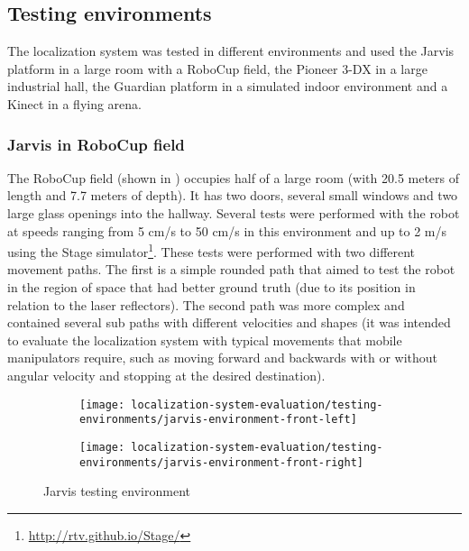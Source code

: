 \subsection{Testing environments}

The localization system was tested in different environments and used the Jarvis platform in a large room with a RoboCup field, the Pioneer 3-DX in a large industrial hall, the Guardian platform in a simulated indoor environment and a Kinect in a flying arena.


\subsubsection{Jarvis in RoboCup field}

The RoboCup field (shown in ) occupies half of a large room (with 20.5 meters of length and 7.7 meters of depth). It has two doors, several small windows and two large glass openings into the hallway. Several tests were performed with the robot at speeds ranging from 5 cm/s to 50 cm/s in this environment and up to 2 m/s using the Stage simulator\footnote{\url{http://rtv.github.io/Stage/}}. These tests were performed with two different movement paths. The first is a simple rounded path that aimed to test the robot in the region of space that had better ground truth (due to its position in relation to the laser reflectors). The second path was more complex and contained several sub paths with different velocities and shapes (it was intended to evaluate the localization system with typical movements that mobile manipulators require, such as moving forward and backwards with or without angular velocity and stopping at the desired destination).


\begin{figure}[H]
	\centering
	\begin{subfigure}[ht]{0.45\textwidth}
		\centering
		\texttt{[image: localization-system-evaluation/testing-environments/jarvis-environment-front-left]}
	\end{subfigure}
	\begin{subfigure}[ht]{0.45\textwidth}
		\centering
		\texttt{[image: localization-system-evaluation/testing-environments/jarvis-environment-front-right]}
	\end{subfigure}
	\caption{Jarvis testing environment}
	\label{fig:localization-system-evaluation_jarvis-tests-environment}
\end{figure}


